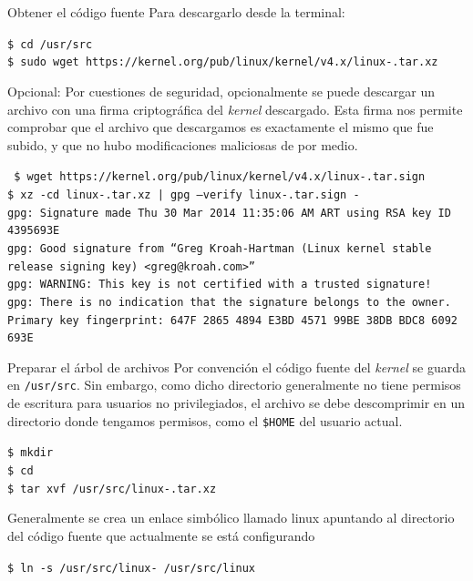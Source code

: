 \begin{frame}{Obtener el código fuente}
  Para descargarlo desde la terminal:
  \begin{block}{}
    \tiny {
    \texttt{\$ cd /usr/src}\\
    \texttt{\$ sudo wget
      https://kernel.org/pub/linux/kernel/v4.x/linux-\KERNELBASEVERSION.tar.xz} }
  \end{block}	
  \vfill
  \alert{Opcional}: Por cuestiones de seguridad, opcionalmente se puede
  descargar un archivo con una firma criptográfica del \textit{kernel}
  descargado. Esta firma nos permite comprobar que el archivo que
  descargamos es exactamente el mismo que fue subido, y que no hubo
  modificaciones maliciosas de por medio.
  \begin{block}{}
    \tiny{\texttt{%
\$ wget https://kernel.org/pub/linux/kernel/v4.x/linux-\KERNELBASEVERSION.tar.sign \\
\$ xz -cd linux-\KERNELBASEVERSION.tar.xz | gpg --verify linux-\KERNELBASEVERSION.tar.sign -\\
gpg: Signature made Thu 30 Mar 2014 11:35:06 AM ART using RSA key ID 4395693E\\
gpg: Good signature from ``Greg Kroah-Hartman (Linux kernel stable release signing key) <greg@kroah.com>''\\
gpg: WARNING: This key is not certified with a trusted signature!\\
gpg:          There is no indication that the signature belongs to the owner.\\
Primary key fingerprint: 647F 2865 4894 E3BD 4571  99BE 38DB BDC8 6092 693E}}
\end{block}
    
\end{frame}

\begin{frame}{Preparar el árbol de archivos}
  Por convención el código fuente del \textit{kernel} se guarda en
  \texttt{/usr/src}. Sin embargo, como dicho directorio generalmente no
  tiene permisos de escritura para usuarios no privilegiados, el archivo se
  debe descomprimir en un directorio donde tengamos permisos, como el
  \texttt{\$HOME} del usuario actual.
  { \small
  \begin{block}{}
    \texttt{\$ mkdir \KERNELSOURCEPATH}\\
    \texttt{\$ cd \KERNELSOURCEPATH}\\
    \texttt{\$ tar xvf /usr/src/linux-\KERNELBASEVERSION.tar.xz}
  \end{block}}
  Generalmente se crea un enlace simbólico llamado linux apuntando al directorio del código fuente que actualmente se está configurando
  \begin{block}{}
    \texttt{\$ ln -s /usr/src/linux-\KERNELBASEVERSION\   /usr/src/linux}
  \end{block}

\end{frame}

